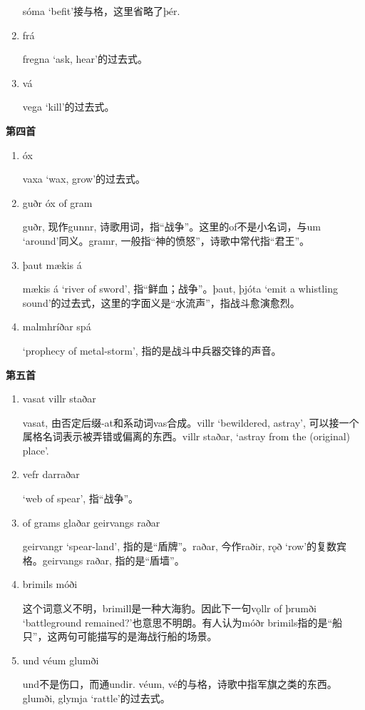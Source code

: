 \begin{grammar*}{}
\begin{enumerate}[leftmargin=*]
              sóma `befit'接与格，这里省略了þér.

        \item frá

              fregna `ask, hear'的过去式。
        \item vá

              vega `kill'的过去式。
    \end{enumerate}
    \textbf{第四首}
    \begin{enumerate}[leftmargin=*]
        \item óx

              vaxa `wax, grow'的过去式。
        \item guðr óx of gram

              guðr, 现作gunnr, 诗歌用词，指“战争”。这里的of不是小名词，与um `around'同义。gramr, 一般指“神的愤怒”，诗歌中常代指“君王”。

        \item þaut mækis á

              mækis á `river of sword', 指“鲜血；战争”。þaut, þjóta `emit a whistling sound'的过去式，这里的字面义是“水流声”，指战斗愈演愈烈。

        \item malmhríðar spá

              `prophecy of metal-storm', 指的是战斗中兵器交锋的声音。
    \end{enumerate}
    \textbf{第五首}
    \begin{enumerate}[leftmargin=*]
        \item vasat villr staðar

              vasat, 由否定后缀-at和系动词vas合成。villr `bewildered, astray', 可以接一个属格名词表示被弄错或偏离的东西。villr staðar, `astray from the (original) place'.

        \item vefr darraðar

              `web of spear', 指“战争”。
        \item of grams glaðar geirvangs raðar

              geirvangr `spear-land', 指的是“盾牌”。raðar, 今作raðir, rǫð `row'的复数宾格。geirvangs raðar, 指的是“盾墙”。

        \item brimils móði

              这个词意义不明，brimill是一种大海豹。因此下一句vǫllr of þrumði `battleground remained?'也意思不明朗。有人认为móðr brimils指的是“船只”，这两句可能描写的是海战行船的场景。

        \item und véum glumði

              und不是伤口，而通undir. véum, vé的与格，诗歌中指军旗之类的东西。glumði, glymja `rattle'的过去式。
    \end{enumerate}
\end{grammar*}
